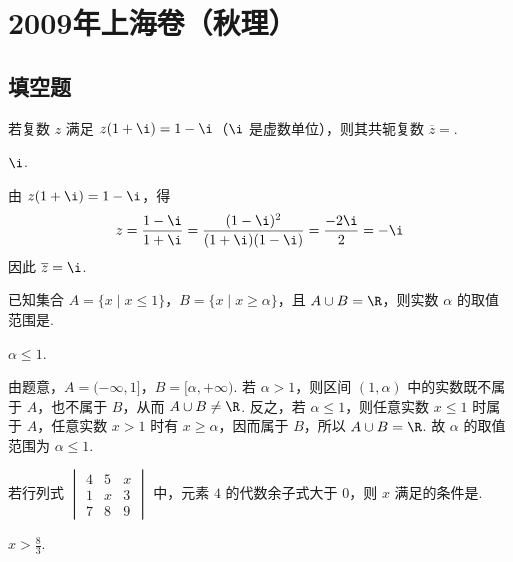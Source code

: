 \chapter{2009年上海卷（秋理）}

\section{填空题}

\begin{problem}
若复数 \(z\) 满足 \(z(1 + \i) = 1 - \i\)（\(\i\) 是虚数单位），则其共轭复数 \(\overline{z} =\)\fillinblank{}.
\end{problem}

\begin{answer}
\(\i\).
\end{answer}

\begin{solution}
由 \(z(1+\i)=1-\i\)，得
\[
z=\frac{1-\i}{1+\i}=\frac{(1-\i)^2}{(1+\i)(1-\i)}=\frac{-2\i}{2}=-\i
\]
因此 \(\overline{z}=\i\).
\end{solution}

\begin{problem}
已知集合 \(A = \{x \mid x \leqslant 1\}\)，\(B = \{x \mid x \geqslant \alpha\}\)，且 \(A \cup B = \R\)，则实数 \(\alpha\) 的取值范围是\fillinblank{}.
\end{problem}

\begin{answer}
\(\alpha \leqslant 1\).
\end{answer}

\begin{solution}
由题意，\(A=(-\infty,1]\)，\(B=[\alpha,+\infty)\). 若 \(\alpha>1\)，则区间 \((1,\alpha)\) 中的实数既不属于 \(A\)，也不属于 \(B\)，从而 \(A\cup B\neq\R\). 反之，若 \(\alpha\leqslant1\)，则任意实数 \(x\leqslant1\) 时属于 \(A\)，任意实数 \(x>1\) 时有 \(x\geqslant\alpha\)，因而属于 \(B\)，所以 \(A\cup B=\R\). 故 \(\alpha\) 的取值范围为 \(\alpha\leqslant1\).
\end{solution}

\begin{problem}
若行列式 \(\begin{vmatrix} 4 & 5 & x \\ 1 & x & 3 \\ 7 & 8 & 9 \end{vmatrix}\) 中，元素 \(4\) 的代数余子式大于 \(0\)，则 \(x\) 满足的条件是\fillinblank{}.
\end{problem}

\begin{answer}
\(x > \frac{8}{3}\).
\end{answer}

